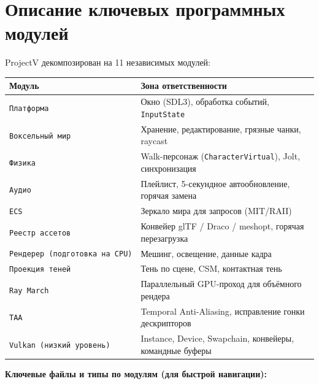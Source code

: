 \section{Описание ключевых программных модулей}\label{KT-2.1_Architecture-ux43eux43fux438ux441ux430ux43dux438ux435-ux43aux43bux44eux447ux435ux432ux44bux445-ux43fux440ux43eux433ux440ux430ux43cux43cux43dux44bux445-ux43cux43eux434ux443ux43bux435ux439}

ProjectV декомпозирован на 11 независимых модулей:

\begin{longtable}[]{@{}ll@{}}
\toprule\noalign{}
Модуль & Зона ответственности \\
\midrule\noalign{}
\endhead
\bottomrule\noalign{}
\endlastfoot
\texttt{Платформа} & Окно (SDL3), обработка событий, \texttt{InputState} \\
\texttt{Воксельный\ мир} & Хранение, редактирование, грязные чанки, raycast \\
\texttt{Физика} & Walk-персонаж (\texttt{CharacterVirtual}), Jolt, синхронизация \\
\texttt{Аудио} & Плейлист, 5-секундное автообновление, горячая замена \\
\texttt{ECS} & Зеркало мира для запросов (MIT/RAII) \\
\texttt{Реестр\ ассетов} & Конвейер glTF / Draco / meshopt, горячая перезагрузка \\
\texttt{Рендерер\ (подготовка\ на\ CPU)} & Мешинг, освещение, данные кадра \\
\texttt{Проекция\ теней} & Тень по сцене, CSM, контактная тень \\
\texttt{Ray\ March} & Параллельный GPU-проход для объёмного рендера \\
\texttt{TAA} & Temporal Anti-Aliasing, исправление гонки дескрипторов \\
\texttt{Vulkan\ (низкий\ уровень)} & Instance, Device, Swapchain, конвейеры, командные буферы \\
\end{longtable}

\textbf{Ключевые файлы и типы по модулям (для быстрой навигации):}

